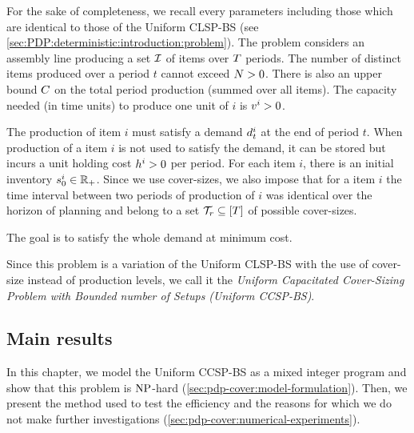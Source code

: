 For the sake of completeness, we recall every parameters including those which are identical to those of the Uniform CLSP-BS (see \cref{sec:PDP:deterministic:introduction:problem}).
The problem considers an assembly line producing a set $\mathcal{I}$ of items over $T$ periods.
The number of distinct items produced over a period $t$ cannot exceed $N>0$.
There is also an upper bound $C$ on the total period production (summed over all items).
The capacity needed (in time units) to produce one unit of $i$ is $v^i>0$.


The production of item $i$ must satisfy a demand $d_t^i$ at the end of period $t$.
When production of a item $i$ is not used to satisfy the demand, it can be stored but incurs a unit holding cost $h^i>0$ per period.
For each item $i$, there is an initial inventory $s_0^i\in\mathbb{R}_+$.
Since we use cover-sizes, we also impose that for a item $i$ the time interval between two periods of production of $i$ was identical over the horizon of planning and belong to a set $\coverset_r\subseteq\range{\horizon}$ of possible cover-sizes.


The goal is to satisfy the whole demand at minimum cost.


Since this problem is a variation of the Uniform CLSP-BS with the use of cover-size instead of production levels, we call it the \emph{Uniform Capacitated Cover-Sizing Problem with Bounded number of Setups (Uniform CCSP-BS)}.



\subsection{Main results}


In this chapter, we model the Uniform CCSP-BS as a mixed integer program and show that this problem is $\operatorname{NP}$-hard (\cref{sec:pdp-cover:model-formulation}).
Then, we present the method used to test the efficiency and the reasons for which we do not make further investigations (\cref{sec:pdp-cover:numerical-experiments}).





